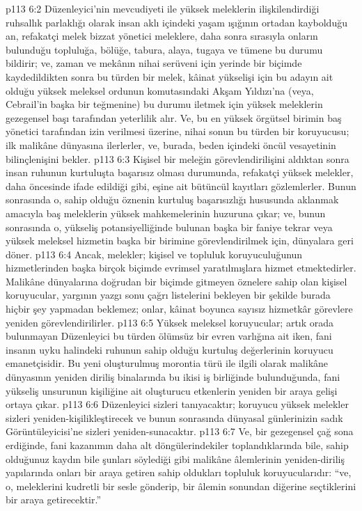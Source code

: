 \vs p113 6:2 Düzenleyici’nin mevcudiyeti ile yüksek meleklerin ilişkilendirdiği ruhsallık parlaklığı olarak insan aklı içindeki yaşam ışığının ortadan kaybolduğu an, refakatçi melek bizzat yönetici meleklere, daha sonra sırasıyla onların bulunduğu topluluğa, bölüğe, tabura, alaya, tugaya ve tümene bu durumu bildirir; ve, zaman ve mekânın nihai serüveni için yerinde bir biçimde kaydedildikten sonra bu türden bir melek, kâinat yükselişi için bu adayın ait olduğu yüksek meleksel ordunun komutasındaki Akşam Yıldızı’na (veya, Cebrail’in başka bir teğmenine) bu durumu iletmek için yüksek meleklerin gezegensel başı tarafından yeterlilik alır. Ve, bu en yüksek örgütsel birimin baş yönetici tarafından izin verilmesi üzerine, nihai sonun bu türden bir koruyucusu; ilk malikâne dünyasına ilerlerler, ve, burada, beden içindeki öncül vesayetinin bilinçlenişini bekler.
\vs p113 6:3 Kişisel bir meleğin görevlendirilişini aldıktan sonra insan ruhunun kurtuluşta başarısız olması durumunda, refakatçi yüksek melekler, daha öncesinde ifade edildiği gibi, eşine ait bütüncül kayıtları gözlemlerler. Bunun sonrasında o, sahip olduğu öznenin kurtuluş başarısızlığı hususunda aklanmak amacıyla baş meleklerin yüksek mahkemelerinin huzuruna çıkar; ve, bunun sonrasında o, yükseliş potansiyelliğinde bulunan başka bir faniye tekrar veya yüksek meleksel hizmetin başka bir birimine görevlendirilmek için, dünyalara geri döner.
\vs p113 6:4 Ancak, melekler; kişisel ve topluluk koruyuculuğunun hizmetlerinden başka birçok biçimde evrimsel yaratılmışlara hizmet etmektedirler. Malikâne dünyalarına doğrudan bir biçimde gitmeyen öznelere sahip olan kişisel koruyucular, yargının yazgı sonu çağrı listelerini bekleyen bir şekilde burada hiçbir şey yapmadan beklemez; onlar, kâinat boyunca sayısız hizmetkâr görevlere yeniden görevlendirilirler.
\vs p113 6:5 Yüksek meleksel koruyucular; artık orada bulunmayan Düzenleyici bu türden ölümsüz bir evren varlığına ait  iken, fani insanın uyku halindeki ruhunun sahip olduğu kurtuluş değerlerinin koruyucu emanetçisidir. Bu yeni oluşturulmuş morontia türü ile ilgili olarak malikâne dünyasının yeniden diriliş binalarında bu ikisi iş birliğinde bulunduğunda, fani yükseliş unsurunun kişiliğine ait oluşturucu etkenlerin yeniden bir araya gelişi ortaya çıkar.
\vs p113 6:6 Düzenleyici sizleri tanıyacaktır; koruyucu yüksek melekler sizleri yeniden\hyp{}kişilikleştirecek ve bunun sonrasında dünyasal günlerinizin sadık Görüntüleyicisi’ne sizleri yeniden\hyp{}sunacaktır.
\vs p113 6:7 Ve, bir gezegensel çağ sona erdiğinde, fani kazanımın daha alt döngülerindekiler toplandıklarında bile, sahip olduğunuz kaydın bile şunları söylediği gibi malikâne âlemlerinin yeniden\hyp{}diriliş yapılarında onları bir araya getiren sahip oldukları topluluk koruyucularıdır: “ve, o, meleklerini kudretli bir sesle gönderip, bir âlemin sonundan diğerine seçtiklerini bir araya getirecektir.”
